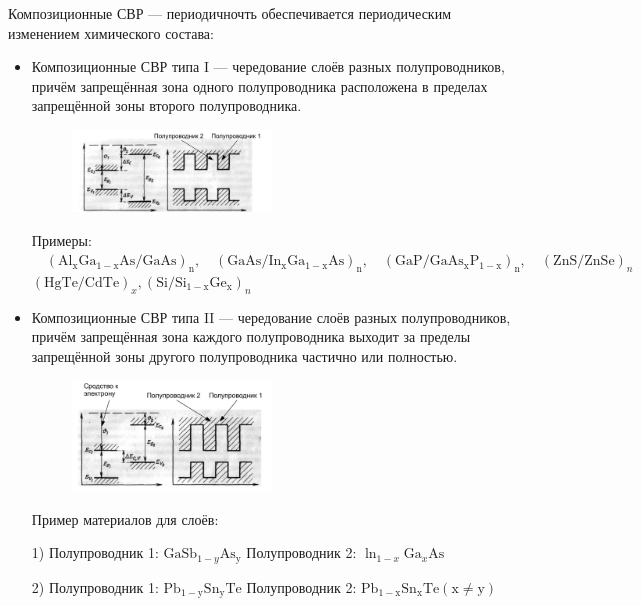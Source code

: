 Композиционные СВР –-- периодичночть обеспечивается периодическим изменением химического состава:
\begin{itemize}
    \item Композиционные СВР типа I –-- чередование слоёв разных
полупроводников, причём запрещённая зона одного полупроводника
расположена в пределах запрещённой зоны второго полупроводника.
\begin{figure}[h!]
    \centering
    \includegraphics[width=0.5\textwidth]{images/ph30.1.jpg}
\end{figure}
Примеры: $\quad\left(\mathrm{Al}_{\mathrm{x}} \mathrm{Ga}_{1-\mathrm{x}} \mathrm{As} / \mathrm{GaAs}\right)_{\mathrm{n}}, \quad\left(\mathrm{GaAs} / \mathrm{In}_{\mathrm{x}} \mathrm{Ga}_{1-\mathrm{x}} \mathrm{As}\right)_{\mathrm{n}}, \quad\left(\mathrm{GaP} / \mathrm{GaAs}_{\mathrm{x}} \mathrm{P}_{1-\mathrm{x}}\right)_{\mathrm{n}}, \quad(\mathrm{ZnS} / \mathrm{ZnSe})_n$ $(\mathrm{HgTe} / \mathrm{CdTe})_x,\left(\mathrm{Si} / \mathrm{Si}_{1-\mathrm{x}} \mathrm{Ge}_{\mathrm{x}}\right)_n$
    \item Композиционные СВР типа II –-- чередование слоёв разных полупроводников, причём запрещённая зона каждого полупроводника выходит за пределы запрещённой зоны другого полупроводника частично или полностью.
\begin{figure}[h!]
    \centering
    \includegraphics[width=0.5\textwidth]{images/ph30.2.jpg}
\end{figure}
Пример материалов для слоёв: 

1) Полупроводник 1: $\mathrm{GaSb}_{1-y} \mathrm{As}_{\mathrm{y}}$ Полупроводник 2: $\ln _{1-x} \mathrm{Ga}_x \mathrm{As}$

2) Полупроводник 1: $\mathrm{Pb}_{1-\mathrm{y}} \mathrm{Sn}_{\mathrm{y}} \mathrm{Te}$ Полупроводник 2: $\mathrm{Pb}_{1-\mathrm{x}} \mathrm{Sn}_{\mathrm{x}} \mathrm{Te}(\mathrm{x} \neq \mathrm{y})$    


\end{itemize}
